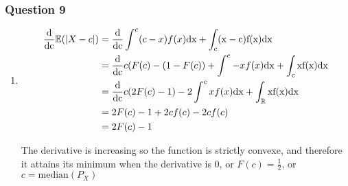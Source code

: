 \documentclass[12pt]{article}
\newcommand{\Q}[1]{\subsubsection*{Question #1}}
\newcommand{\Es}[1]{\mathbb{E}(#1)}
\begin{document}
\Q{9}
\begin{enumerate}
\item 

\begin{align*}
\frac{\rm d}{\rm d c} \Es {|X-c|} &= \frac{\rm d}{\rm d c} \int^c (c-x)f(x) \rm{dx} + \int_c (x-c)f(x) \rm{dx} 
\\&= \frac{\rm d}{\rm d c} c (F(c) - (1-F(c)) + \int^c -xf(x) \rm{dx} + \int_c x f(x) \rm{dx}
\\&= \frac{\rm d}{\rm d c} c (2F(c) - 1) - 2 \int^c xf(x) \rm{dx} + \int_{\mathbb{R}} x f(x) \rm{dx}
\\&= 2F(c)-1 + 2cf(c) - 2 cf(c) 
\\&= 2F(c)-1
\end{align*}

The derivative is increasing so the function is strictly convexe, and therefore it attains its minimum when the derivative is 0, or $F(c) = \frac12$, or $c = \text{median}(P_X)$ 
\end{enumerate}
\end{document}
